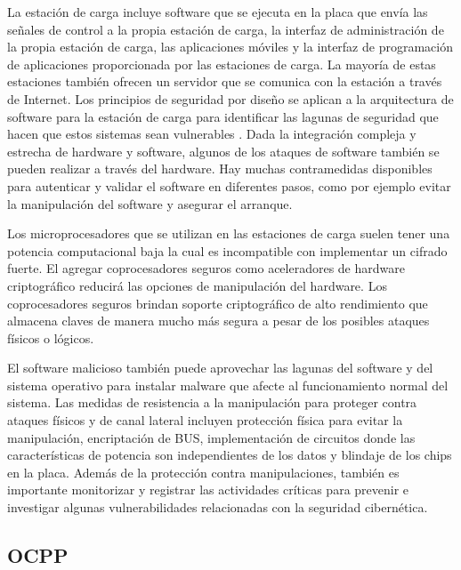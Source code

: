 \documentclass[12pt,a4paper,onecolumn,oneside]{report}
\newcounter{subsubsubsection}[subsubsection]
\begin{document}

La estación de carga incluye software que se ejecuta en la placa que envía las señales de control a la propia estación de carga, la interfaz de administración de la propia estación de carga, las aplicaciones móviles y la interfaz de programación de aplicaciones proporcionada por las estaciones de carga. La mayoría de estas estaciones también ofrecen un servidor que se comunica con la estación a través de Internet. Los principios de seguridad por diseño se aplican a la arquitectura de software para la estación de carga para identificar las lagunas de seguridad que hacen que estos sistemas sean vulnerables \cite{catorce}. Dada la integración compleja y estrecha de hardware y software, algunos de los ataques de software también se pueden realizar a través del hardware. Hay muchas contramedidas disponibles para autenticar y validar el software en diferentes pasos, como por ejemplo evitar la manipulación del software y asegurar el arranque.


Los microprocesadores que se utilizan en las estaciones de carga suelen tener una potencia computacional baja la cual es incompatible con implementar un cifrado fuerte. El agregar coprocesadores seguros como aceleradores de hardware criptográfico \cite{quince} reducirá las opciones de manipulación del hardware. Los coprocesadores seguros brindan soporte criptográfico de alto rendimiento que almacena claves de manera mucho más segura a pesar de los posibles ataques físicos o lógicos.



El software malicioso también puede aprovechar las lagunas del software y del sistema operativo para instalar malware que afecte al funcionamiento normal del sistema. Las medidas de resistencia a la manipulación para proteger contra ataques físicos y de canal lateral incluyen protección física para evitar la manipulación, encriptación de BUS, implementación de circuitos donde las características de potencia son independientes de los datos y blindaje de los chips en la placa. Además de la protección contra manipulaciones, también es importante monitorizar y registrar las actividades críticas para prevenir e investigar algunas vulnerabilidades relacionadas con la seguridad cibernética.



\subsection{OCPP}
\label{OCPP}
\end{document}

